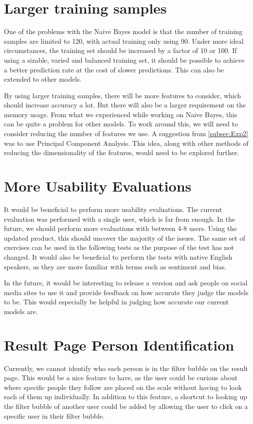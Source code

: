 \section*{Larger training samples}
One of the problems with the Naive Bayes model is that the number of training
samples are limited to 120, with actual training only using 90. Under more ideal
circumstances, the training set should be increased by a factor of 10 or 100.
If using a sizable, varied and balanced training set, it should be possible to achieve a
better prediction rate at the cost of slower predictions. This can also be
extended to other models.\nl

By using larger training samples, there will be more features to consider, which
should increase accuracy a lot. But there will also be a larger requirement on
the memory usage. From what we experienced while working on Naive
Bayes, this can be quite a problem for other models. To work around
this, we will need to consider reducing the number of features we use. A
suggestion from \autoref{subsec:Exp2} was to use Principal Component Analysis.
This idea, along with other methods of reducing the dimensionality of the
features, would need to be explored further.

\section*{More Usability Evaluations}
It would be beneficial to perform more usability evaluations. The current
evaluation was performed with a single user, which is far from enough. In the
future, we should perform more evaluations with between 4-8 users. Using the
updated product, this should uncover the majority of the issues. The same set of
exercises can be used in the following tests as the purpose of the test has not
changed. It would also be beneficial to perform the tests with native English
speakers, as they are more familiar with terms such as sentiment and bias.\nl
 
In the future, it would be interesting to release a version and ask people on
social media sites to use it and provide feedback on how accurate they judge
the models to be. This would especially be helpful in judging how accurate our
current models are.

\section*{Result Page Person Identification}
Currently, we cannot identify who each person is in the filter bubble on the
result page. This would be a nice feature to have, as the user could be
curious about where specific people they follow are placed on the scale without
having to look each of them up individually. In addition to this feature, a
shortcut to looking up the filter bubble of another user could be added by
allowing the user to click on a specific user in their filter bubble.



